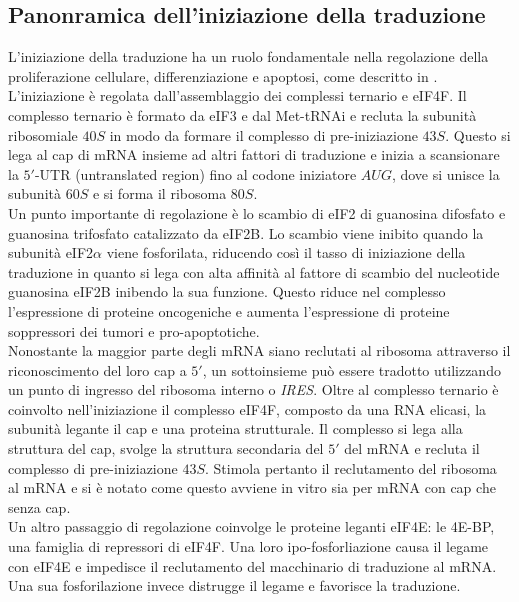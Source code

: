 	\subsection{Panonramica dell'iniziazione della traduzione}
	L'iniziazione della traduzione ha un ruolo fondamentale nella regolazione della proliferazione cellulare, differenziazione e apoptosi, come descritto in \cite{transconp53}.
	L'iniziazione \`e regolata dall'assemblaggio dei complessi ternario e eIF4F.
	Il complesso ternario \`e formato da eIF3 e dal Met-tRNAi e recluta la subunit\`a ribosomiale $40S$ in modo da formare il complesso di pre-iniziazione $43S$.
	Questo si lega al cap di mRNA insieme ad altri fattori di traduzione e inizia a scansionare la $5'$-UTR (untranslated region) fino al codone iniziatore $AUG$, dove si unisce la subunit\`a $60S$ e si forma il ribosoma $80S$.\\
	Un punto importante di regolazione \`e lo scambio di eIF2 di guanosina difosfato e guanosina trifosfato catalizzato da eIF2B.
	Lo scambio viene inibito quando la subunit\`a eIF2$\alpha$ viene fosforilata, riducendo cos\`i il tasso di iniziazione della traduzione in quanto si lega con alta affinit\`a al fattore di scambio del nucleotide guanosina eIF2B inibendo la sua funzione.
	Questo riduce nel complesso l'espressione di proteine oncogeniche e aumenta l'espressione di proteine soppressori dei tumori e pro-apoptotiche.\\
	Nonostante la maggior parte degli mRNA siano reclutati al ribosoma attraverso il riconoscimento del loro cap a $5'$, un sottoinsieme pu\`o essere tradotto utilizzando un punto di ingresso del ribosoma interno o \emph{IRES}.
	Oltre al complesso ternario \`e coinvolto nell'iniziazione il complesso eIF4F, composto da una RNA elicasi, la subunit\`a legante il cap e una proteina strutturale.
	Il complesso si lega alla struttura del cap, svolge la struttura secondaria del $5'$ del mRNA e recluta il complesso di pre-iniziazione $43S$.
	Stimola pertanto il reclutamento del ribosoma al mRNA e si \`e notato come questo avviene in vitro sia per mRNA con cap che senza cap.\\
	Un altro passaggio di regolazione coinvolge le proteine leganti eIF4E: le 4E-BP, una famiglia di repressori di eIF4F.
	Una loro ipo-fosforliazione causa il legame con eIF4E e impedisce il reclutamento del macchinario di traduzione al mRNA.
	Una sua fosforilazione invece distrugge il legame e favorisce la traduzione.

